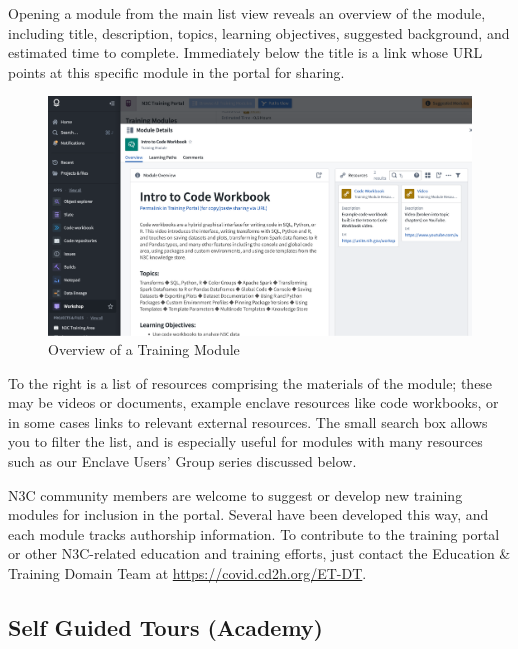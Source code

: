 \documentclass[
  letterpaper,
  DIV=11,
  numbers=noendperiod]{scrreprt}
\begin{document}
Opening a module from the main list view reveals an overview of the
module, including title, description, topics, learning objectives,
suggested background, and estimated time to complete. Immediately below
the title is a link whose URL points at this specific module in the
portal for sharing.

\begin{figure}

{\centering \includegraphics{chapters/images/support/image-14-training-module-overview.png}

}

\caption{\label{fig-support-training-module-overview}Overview of a
Training Module}

\end{figure}

To the right is a list of resources comprising the materials of the
module; these may be videos or documents, example enclave resources like
code workbooks, or in some cases links to relevant external resources.
The small search box allows you to filter the list, and is especially
useful for modules with many resources such as our Enclave Users' Group
series discussed below.

N3C community members are welcome to suggest or develop new training
modules for inclusion in the portal. Several have been developed this
way, and each module tracks authorship information. To contribute to the
training portal or other N3C-related education and training efforts,
just contact the Education \& Training Domain Team at
\url{https://covid.cd2h.org/ET-DT}.

\hypertarget{sec-support-training-academy}{%
\subsection{Self Guided Tours
(Academy)}\label{sec-support-training-academy}}
\end{document}
